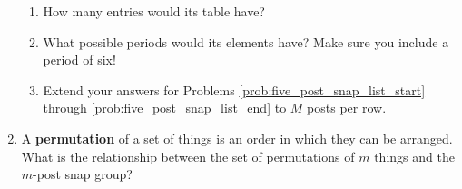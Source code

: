 \documentclass[../textbook.tex]{subfiles}
\begin{document}
\begin{enumerate}
\begin{enumerate}
\item How many entries would its table have?
\item What possible periods would its elements have? Make sure you include a period of six! \label{prob:five_post_snap_list_end}
\item Extend your answers for Problems \ref{prob:five_post_snap_list_start} through \ref{prob:five_post_snap_list_end} to $M$ posts per row.
\end{enumerate}
\item A \textbf{permutation} of a set of things is an order in which they can be arranged. What is the relationship between the set of permutations of $m$ things and the $m$-post snap group?
\end{enumerate}
\end{document}
